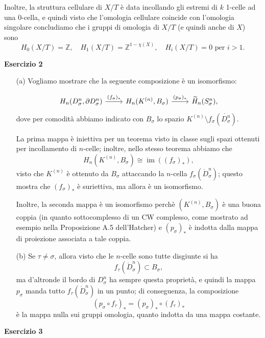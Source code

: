 \documentclass[a4paper]{article}
\newcommand{\Z}{\mathbb{Z}}
\newcommand{\im}{\operatorname{im}}
\theoremstyle{definition}
\theoremstyle{definition}
\theoremstyle{remark}
\theoremstyle{definition}
\begin{document}
\begin{itemize}
        Inoltre, la struttura cellulare di $X/T$ è data incollando gli estremi di $k$ 1-celle ad una 0-cella, e quindi visto che l'omologia cellulare coincide con l'omologia singolare concludiamo che i gruppi di omologia di $X/T$ (e quindi anche di $X$) sono
        \[
            H_0(X/T) = \Z, \quad H_1(X/T) = \Z^{1-\chi(X)}, \quad H_i(X/T) = 0 \text{ per } i>1.
        \]
\end{itemize}

\textbf{Esercizio 2}
\begin{itemize}
    \item[(a)] Vogliamo mostrare che la seguente composizione è un isomorfismo:

        \[
            \begin{tikzcd}
                H_n(D_\sigma^n,\partial D_\sigma^n) \arrow[r, "(f_\sigma)_*"] & H_n(K^{(n)},B_\sigma) \arrow[r, "(p_\sigma)_*"] & \widetilde{H}_n(S_\sigma^n),
            \end{tikzcd}
        \]
        dove per comodità abbiamo indicato con $B_\sigma$ lo spazio $K^{(n)}\setminus f_\sigma(\mathring{D_\sigma^n})$.

        La prima mappa è iniettiva per un teorema visto in classe sugli spazi ottenuti per incollamento di $n$-celle; inoltre, nello stesso teorema abbiamo che
        \[
            H_n(K^{(n)},B_\sigma) \cong \im{((f_\sigma)_*)},
        \]
        visto che $K^{(n)}$ è ottenuto da $B_\sigma$ attaccando la $n$-cella $f_\sigma(\mathring{D}_\sigma^n)$; questo mostra che $(f_\sigma)_*$ è suriettiva, ma allora è un isomorfismo.

        Inoltre, la seconda mappa è un isomorfismo perchè $(K^{(n)},B_\sigma)$ è una buona coppia (in quanto sottocomplesso di un CW complesso, come mostrato ad esempio nella Proposizione A.5 dell'Hatcher) e $(p_\sigma)_*$ è indotta dalla mappa di proiezione associata a tale coppia.

    \item[(b)] Se $\tau\neq \sigma$, allora visto che le $n$-celle sono tutte disgiunte si ha
        \[f_\tau(\mathring{D}_\sigma^n)\subset B_\sigma,\]
        ma d'altronde il bordo di $D_\sigma^n$ ha sempre questa proprietà, e quindi la mappa $p_\sigma$ manda tutto $f_\tau(\mathring{D}_\sigma^n)$ in un punto; di conseguenza, la composizione \[(p_\sigma\circ f_\tau)_* = (p_\sigma)_*\circ (f_\tau)_*\] è la mappa nulla sui gruppi omologia, quanto indotta da una mappa costante.
\end{itemize}

\textbf{Esercizio 3}
\end{document}
